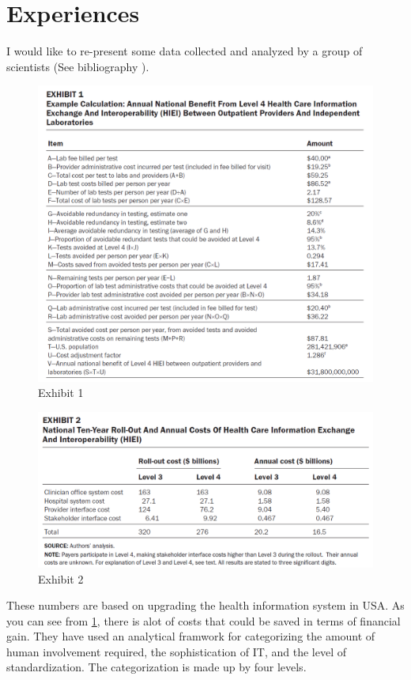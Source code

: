 \section{Experiences}
I would like to re-present some data collected and analyzed by a group of scientists (See bibliography \cite{11}).
\begin{figure}
\centering
\includegraphics[width=12cm]{litterature/images/exhibit1}
\caption{Exhibit 1}
\label{fig:exhibit_1}
\end{figure}
\begin{figure}
\centering
\includegraphics[width=12cm]{litterature/images/exhibit2}
\caption{Exhibit 2}
\label{fig:exhibit_2}
\end{figure}
These numbers are based on upgrading the health information system in USA. As you can see from \ref{fig:exhibit_1}, there is alot of costs that could be saved in terms of financial gain.
They have used an analytical framwork for categorizing the amount of human involvement required, the sophistication of IT, and the level of standardization. The categorization is made up by four levels.
